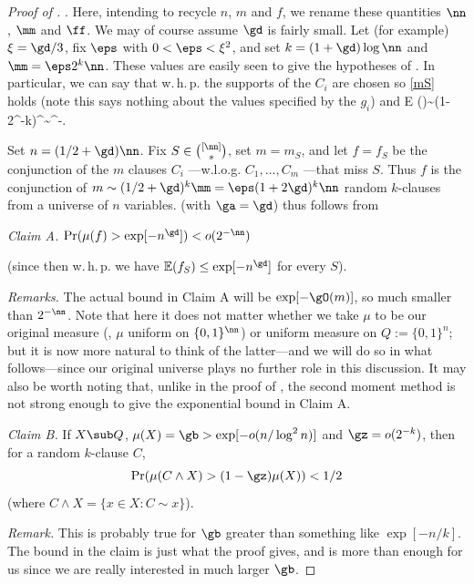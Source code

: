\begin{proof}[Proof of ].   %
Here, intending to recycle $n$, $m$ and $f$, we rename
these quantities
$\nn$, $\mm$ and $\ff$.
We may of course assume $\gd$ is fairly small.
Let (for example) $\xi = \gd/3$, fix $\eps$ with
$0<\eps < \xi^2$, and set
$k=(1+\gd)\log \nn$ and $\mm = \eps 2^k \nn$.
These values are easily seen to give the hypotheses of
 .
In particular, we can say that w.\,h.\,p.
the supports of the %
$C_i$  %
are chosen so \eqref{mS} holds
(note this says nothing about the values specified by
%
the $g_i$) %
and
\mathbb E (\ff)\sim (1-2^{-k})^\mm\sim \eee^{-\eps \nn}.
\enq




Set $n=(1/2+\gd) \nn$.
Fix %
$S\in \binom{[\nn]}{s}$, %
set $m=m_S$,
and
let $f=f_S$ be the %
conjunction  %
of the $m$ %
clauses $C_i$%
---w.l.o.g. %
$C_1,\dots, C_m$%
---that miss $S$.
Thus $f$ is the %
conjunction of %
$m\sim (1/2+\gd)^k\mm =\eps (1+2\gd)^k\nn$
random $k$-clauses from a universe of $n$ variables.
 (with $\ga=\gd$) thus follows from

\mn
\emph{Claim A.}
$\Pr(\mu(f)  > \exp[-n^{\gd}]) < o(2^{-\nn})$

\mn
(since then w.\,h.\,p. we have $\mathbb E (f_S)\leq \exp[-n^{\gd}]$ for every $S$).


\mn
\emph{Remarks.}
The actual bound in Claim A will be
$\exp[-\gO(m)]$,
so much smaller than $2^{-\nn}$.
Note that here it %
does not %
matter whether we take $\mu$ to be
our original measure (\ie, $\mu$ uniform on $\{0,1\}^\nn$)
or uniform measure on $Q:=\{0,1\}^n$;
but it is %
now more natural to think of
the latter---and we will do so in what follows---since
our original universe plays no further role in this discussion.
It may also be worth noting that, unlike in the proof of
, the second moment method is not strong
enough to give the exponential bound in Claim A.




\mn
\emph{Claim B.}
If $X\sub Q$,
$\mu (X) =\gb> \exp[-o(n/\log^2n)]$ and $\gz =o(2^{-k})$,
then for a random $k$-clause $C$,
$$
\Pr(\mu (C\wedge X) >(1-\gz)\mu (X)) < 1/2
$$
(where $C\wedge X =\{x\in X: C\sim x\}$).


\mn
\emph{Remark.}  This is probably true for
$\gb$ greater than something like $\exp[-n/k]$.
The bound in the claim
is just what the proof gives, and is more than enough
for us since %
we are %
really interested in much larger $\gb$.



\end{proof}
